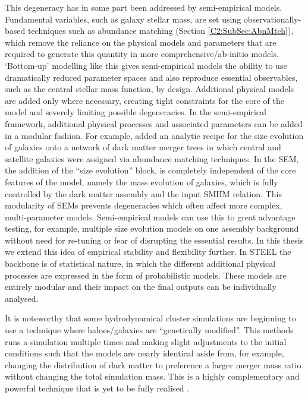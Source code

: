 This degeneracy has in some part been addressed by semi-empirical models. Fundamental variables, such as galaxy stellar mass, are set using observationally-based techniques such as abundance matching (Section \ref{C2:SubSec:AbnMtch}), which remove the reliance on the physical models and parameters that are required to generate this quantity in more comprehensive/ab-initio models. `Bottom-up' modelling like this gives semi-empirical models the ability to use dramatically reduced parameter spaces and also reproduce essential observables, such as the central stellar mass function, by design. Additional physical models are added only where necessary, creating tight constraints for the core of the model and severely limiting possible degeneracies. In the semi-empirical framework, additional physical processes and associated parameters can be added in a modular fashion. For example, \citet{Shankar2014} added an analytic recipe for the size evolution of galaxies onto a network of dark matter merger trees in which central and satellite galaxies were assigned via abundance matching techniques. In the \citet{Shankar2014} SEM, the addition of the ``size evolution'' block, is completely independent of the core features of the model, namely the mass evolution of galaxies, which is fully controlled by the dark matter assembly and the input SMHM relation. This modularity of SEMs prevents degeneracies which often affect more complex, multi-parameter models. Semi-empirical models can use this to great advantage testing, for example, multiple size evolution models on one assembly background without need for re-tuning or fear of disrupting the essential results. In this thesis we extend this idea of empirical stability and flexibility further. In STEEL the backbone is of statistical nature, in which the different additional physical processes are expressed in the form of probabilistic models. These models are entirely modular and their impact on the final outputs can be individually analysed. 

It is noteworthy that some hydrodynamical cluster simulations are beginning to use a technique where haloes/galaxies are ``genetically modified''. This methods runs a simulation multiple times and making slight adjustments to the initial conditions such that the models are nearly identical aside from, for example, changing the distribution of dark matter to preference a larger merger mass ratio without changing the total simulation mass. This is a highly complementary and powerful technique that is yet to be fully realised \cite{Rey2018QuadraticHistory}.

